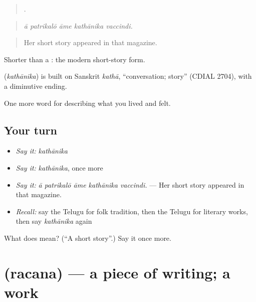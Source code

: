 \begin{quote}
    .
\end{quote}

\begin{quote}
\emph{ā patrikalō āme kathānika vaccindi.}
\end{quote}

\begin{quote}
Her short story appeared in that magazine.
\end{quote}

Shorter than a : the modern short-story form.

\begin{cousinweb}
\textbf{} (\emph{kathānika}) is built on Sanskrit \emph{kathā}, \textquotedblleft{}conversation; story\textquotedblright{} (CDIAL 2704), with a diminutive ending.
\end{cousinweb}

\begin{grammarlens}[title={What you've built}]
One more word for describing what you lived and felt.
\end{grammarlens}

\subsection*{Your turn}
\begin{itemize}
\raggedright
  \item \emph{Say it:} \emph{kathānika}
  \item \emph{Say it:} \emph{kathānika}, once more
  \item \emph{Say it:} \emph{ā patrikalō āme kathānika vaccindi.} — Her short story appeared in that magazine.
  \item \emph{Recall:} say the Telugu for folk tradition, then the Telugu for literary works, then say \emph{kathānika} again
\end{itemize}

\begin{tcolorbox}[breakable,colback=teal!4,colframe=teal!35!black,title={Before you move on}]
What does  mean? (\textquotedblleft{}A short story\textquotedblright{}.) Say it once more.
\end{tcolorbox}
\section[\texorpdfstring{\te{రచన} (racana)}{రచన (racana)}]{ (racana) — a piece of writing; a work}


